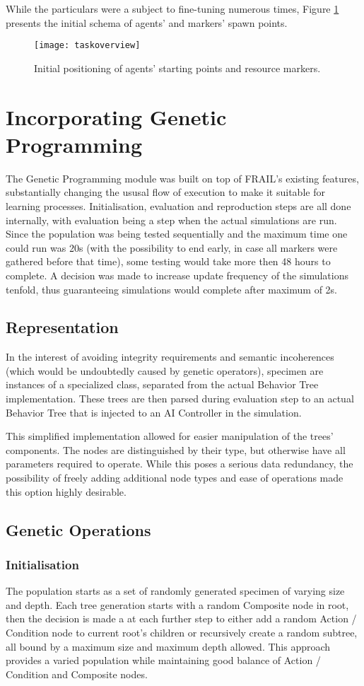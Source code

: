 While the particulars were a subject to fine-tuning numerous times, Figure \ref{fig:x taskoverview} presents the initial schema of agents' and markers' spawn points.
\begin{figure}[h]
    \centering
    \texttt{[image: taskoverview]}
    \caption{Initial positioning of agents' starting points and resource markers.}
    \label{fig:x taskoverview}
\end{figure}
\section{Incorporating Genetic Programming}
The Genetic Programming module was built on top of FRAIL's existing features, substantially changing the ususal flow of execution to make it suitable for learning processes. Initialisation, evaluation and reproduction steps are all done internally, with evaluation being a step when the actual simulations are run. Since the population was being tested sequentially and the maximum time one could run was 20s (with the possibility to end early, in case all markers were gathered before that time), some testing would take more then 48 hours to complete. A decision was made to increase update frequency of the simulations tenfold, thus guaranteeing simulations would complete after maximum of 2s.
\subsection{Representation}
In the interest of avoiding integrity requirements and semantic incoherences (which would be undoubtedly caused by genetic operators), specimen are instances of a specialized class, separated from the actual Behavior Tree implementation. These trees are then parsed during evaluation step to an actual Behavior Tree that is injected to an AI Controller in the simulation.

This simplified implementation allowed for easier manipulation of the trees' components. The nodes are distinguished by their type, but otherwise have all parameters required to operate. While this poses a serious data redundancy, the possibility of freely adding additional node types and ease of operations made this option highly desirable.
\subsection{Genetic Operations}
\subsubsection{Initialisation}
The population starts as a set of randomly generated specimen of varying size and depth. Each tree generation starts with a random Composite node in root, then the decision is made a at each further step to either add a random Action / Condition node to current root's children or recursively create a random subtree, all bound by a maximum size and maximum depth allowed. This approach provides a varied population while maintaining good balance of Action / Condition and Composite nodes.
